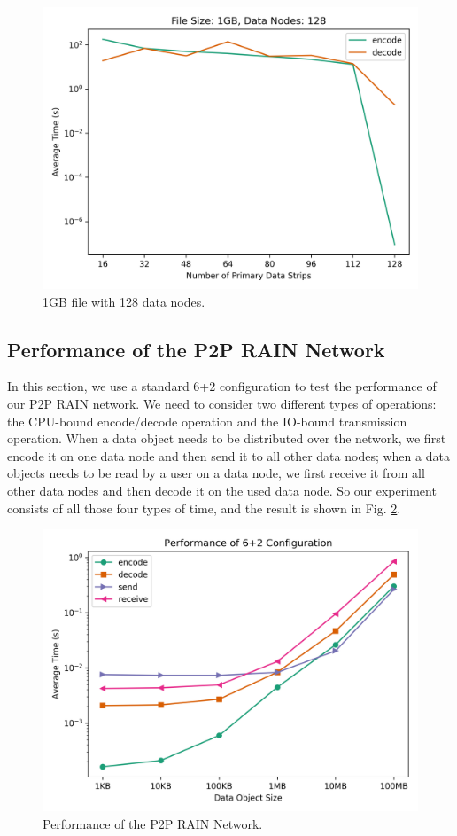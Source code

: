 \documentclass[conference]{IEEEtran}
\begin{document}
\begin{figure}[htbp]
    \centering
    \includegraphics[width=0.8\columnwidth
]{images/encode-decode-size-1GB-n-128.png}
    \caption{1GB file with 128 data nodes.}
    \label{fig:encode-decode-1GB-128}
\end{figure}

\subsection{Performance of the P2P RAIN Network}

In this section, we use a standard 6+2 configuration to test the performance of our P2P RAIN network. We need to consider two different types of operations: the CPU-bound encode/decode operation and the IO-bound transmission operation. When a data object needs to be distributed over the network, we first encode it on one data node and then send it to all other data nodes; when a data objects needs to be read by a user on a data node, we first receive it from all other data nodes and then decode it on the used data node. So our experiment consists of all those four types of time, and the result is shown in Fig. \ref{fig:read-write}. 

\begin{figure}[htbp]
    \centering
    \includegraphics[width=0.8\columnwidth
]{images/read-write.png}
    \caption{Performance of the P2P RAIN Network.}
    \label{fig:read-write}
\end{figure}
\end{document}

